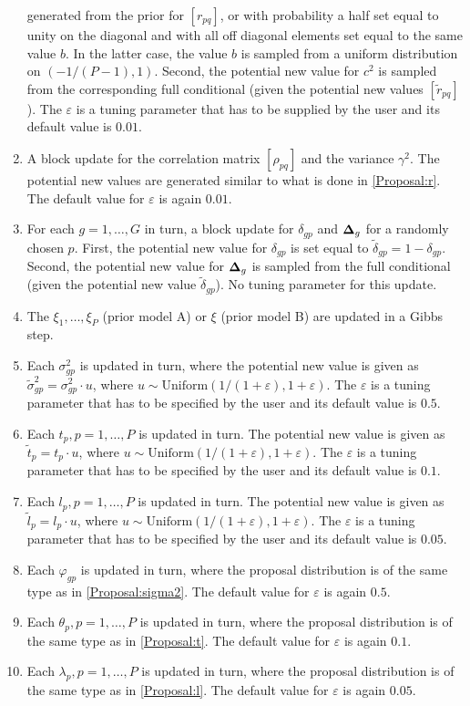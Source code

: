 \documentclass[11pt]{article}
\newcommand{\bDelta}{\mbox{\boldmath $\Delta$}}
\begin{document}
\begin{enumerate}
generated from the prior for $[r_{pq}]$, or with probability a half
set equal to unity on the diagonal and with all off diagonal elements
set equal to the same value $b$. In the latter case, the value $b$ is sampled
from a uniform distribution on $(-1/(P-1),1)$. Second, the potential
new value for $c^2$ is sampled from the corresponding full conditional
(given the potential new values $[\widetilde{r}_{pq}]$). The
$\varepsilon$ is a tuning parameter that has to be supplied by the user and its default value is $0.01$.
\item A block update for the correlation matrix $[\rho_{pq}]$ and the 
variance $\gamma^2$. The potential new values are generated similar to what is done in \ref{Proposal:r}.
The default value for $\varepsilon$ is again $0.01$.
\item For each $g=1,\ldots,G$ in turn, a block update for $\delta_{gp}$ and 
$\bDelta_g$ for a randomly chosen $p$. First, the potential new value for $\delta_{gp}$ is set equal to
$\widetilde{\delta}_{gp} = 1 - \delta_{gp}$. Second, the potential new value
for $\bDelta_g$ is sampled from the full conditional (given the potential
new value $\widetilde{\delta}_{gp}$).
No tuning parameter for this update.
\item The $\xi_1,\ldots,\xi_P$ (prior model A) or $\xi$ (prior model B) are updated in a Gibbs step.
\item \label{Proposal:sigma2}Each $\sigma^2_{gp}$ is updated in turn, where the potential new value is given as
$\widetilde{\sigma}^2_{gp} = \sigma_{gp}^2 \cdot u$, where $u\sim \mbox{Uniform}(1/(1+\varepsilon),1+\varepsilon)$.
The $\varepsilon$ is a tuning parameter that has to be specified by the user and 
its default value is $0.5$.
\item \label{Proposal:t}Each $t_p,p=1,\ldots,P$ is updated in turn. The potential new value is given as 
$\widetilde{t}_p = t_p \cdot u$, where $u\sim\mbox{Uniform}(1/(1+\varepsilon),1+\varepsilon)$.
The $\varepsilon$ is a tuning parameter that has to be specified by the user and 
its default value is $0.1$.
\item \label{Proposal:l}Each $l_p,p=1,\ldots,P$ is updated in turn. The potential new value is given as 
$\widetilde{l}_p = l_p \cdot u$, where $u\sim\mbox{Uniform}(1/(1+\varepsilon),1+\varepsilon)$.
The $\varepsilon$ is a tuning parameter that has to be specified by the user and 
its default value is $0.05$.
\item Each $\varphi_{gp}$ is updated in turn, where the proposal distribution is of the same type as in 
\ref{Proposal:sigma2}. The default value for $\varepsilon$ is again $0.5$.
\item Each $\theta_p,p=1,\ldots,P$ is updated in turn, where the proposal distribution is of the same
type as in \ref{Proposal:t}. The default value for $\varepsilon$ is again $0.1$.
\item Each $\lambda_p,p=1,\ldots,P$ is updated in turn, where the proposal distribution is of the same
type as in \ref{Proposal:l}. The default value for $\varepsilon$ is again $0.05$.


\end{enumerate}
\end{document}
